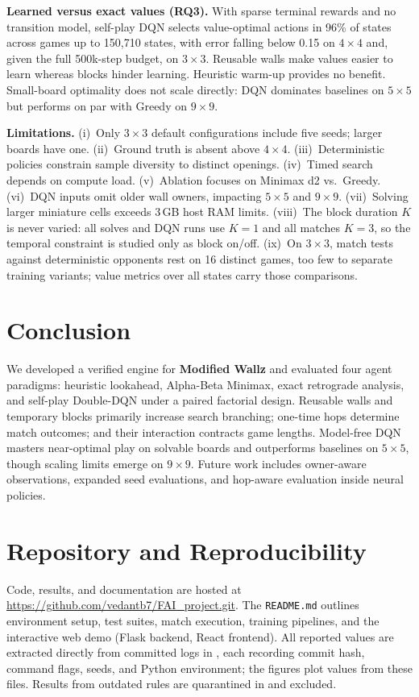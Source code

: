 \documentclass[10pt]{article}
\newcommand{\Wallz}{\textbf{Modified Wallz}}
\begin{document}
\textbf{Learned versus exact values (RQ3).} With sparse terminal rewards and no transition model, self-play DQN selects value-optimal actions in 96\% of states across games up to 150{,}710 states, with error falling below 0.15 on $4\times4$ and, given the full 500k-step budget, on $3\times3$. Reusable walls make values easier to learn whereas blocks hinder learning. Heuristic warm-up provides no benefit. Small-board optimality does not scale directly: DQN dominates baselines on $5\times5$ but performs on par with Greedy on $9\times9$.

\textbf{Limitations.} (i)~Only $3\times3$ default configurations include five seeds; larger boards have one. (ii)~Ground truth is absent above $4\times4$. (iii)~Deterministic policies constrain sample diversity to distinct openings. (iv)~Timed search depends on compute load. (v)~Ablation focuses on Minimax d2 vs.\ Greedy. (vi)~DQN inputs omit older wall owners, impacting $5\times5$ and $9\times9$. (vii)~Solving larger miniature cells exceeds 3\,GB host RAM limits. (viii)~The block duration $K$ is never varied: all solves and DQN runs use $K=1$ and all matches $K=3$, so the temporal constraint is studied only as block on/off. (ix)~On $3\times3$, match tests against deterministic opponents rest on 16 distinct games, too few to separate training variants; value metrics over all states carry those comparisons.

\section{Conclusion}
We developed a verified engine for \Wallz{} and evaluated four agent paradigms: heuristic lookahead, Alpha-Beta Minimax, exact retrograde analysis, and self-play Double-DQN under a paired factorial design. Reusable walls and temporary blocks primarily increase search branching; one-time hops determine match outcomes; and their interaction contracts game lengths. Model-free DQN masters near-optimal play on solvable boards and outperforms baselines on $5\times5$, though scaling limits emerge on $9\times9$. Future work includes owner-aware observations, expanded seed evaluations, and hop-aware evaluation inside neural policies.

\section{Repository and Reproducibility}\label{sec:repo}
Code, results, and documentation are hosted at \url{https://github.com/vedantb7/FAI_project.git}. The \texttt{README.md} outlines environment setup, test suites, match execution, training pipelines, and the interactive web demo (Flask backend, React frontend). All reported values are extracted directly from committed logs in , each recording commit hash, command flags, seeds, and Python environment; the figures plot values from these files. Results from outdated rules are quarantined in  and excluded.
\end{document}
